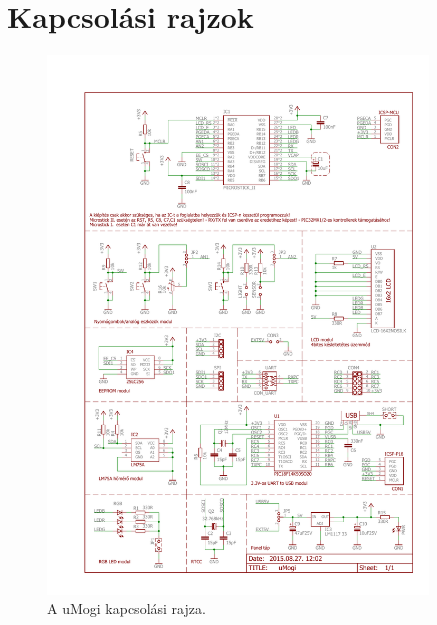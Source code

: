 \clearpage
\section{Kapcsolási rajzok}


\begin{figure}[!ht]
\centering
\includegraphics[width=0.9\textwidth, keepaspectratio]{figures/umogi.pdf}
\caption{A uMogi kapcsolási rajza.} 
\end{figure}
